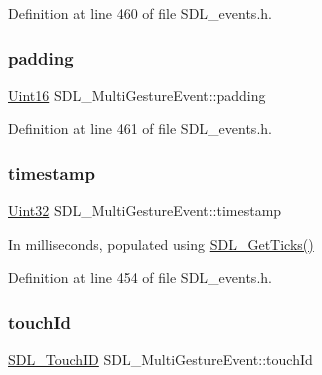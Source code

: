 Definition at line 460 of file S\+D\+L\+\_\+events.\+h.

\mbox{\label{struct_s_d_l___multi_gesture_event_a4804ec87789e697aba138c4888bb304b}} 
\subsubsection{\texorpdfstring{padding}{padding}}
{\footnotesize\ttfamily \mbox{\hyperlink{_s_d_l__stdinc_8h_a31fcc0a076c9068668173ee26d33e42b}{Uint16}} S\+D\+L\+\_\+\+Multi\+Gesture\+Event\+::padding}



Definition at line 461 of file S\+D\+L\+\_\+events.\+h.

\mbox{\label{struct_s_d_l___multi_gesture_event_a7e99a98debf3ce11f6d2a2fbb3637175}} 
\subsubsection{\texorpdfstring{timestamp}{timestamp}}
{\footnotesize\ttfamily \mbox{\hyperlink{_s_d_l__stdinc_8h_add440eff171ea5f55cb00c4a9ab8672d}{Uint32}} S\+D\+L\+\_\+\+Multi\+Gesture\+Event\+::timestamp}

In milliseconds, populated using \mbox{\hyperlink{_s_d_l__timer_8h_a0b9bc71d6287e0ffafdc3419760fe2b3}{S\+D\+L\+\_\+\+Get\+Ticks()}} 

Definition at line 454 of file S\+D\+L\+\_\+events.\+h.

\mbox{\label{struct_s_d_l___multi_gesture_event_aa15d1201559a3c9277082af71a972dc1}} 
\subsubsection{\texorpdfstring{touchId}{touchId}}
{\footnotesize\ttfamily \mbox{\hyperlink{_s_d_l__touch_8h_a10f5f86abe4ea8308a8706bd5d3b337a}{S\+D\+L\+\_\+\+Touch\+ID}} S\+D\+L\+\_\+\+Multi\+Gesture\+Event\+::touch\+Id}

